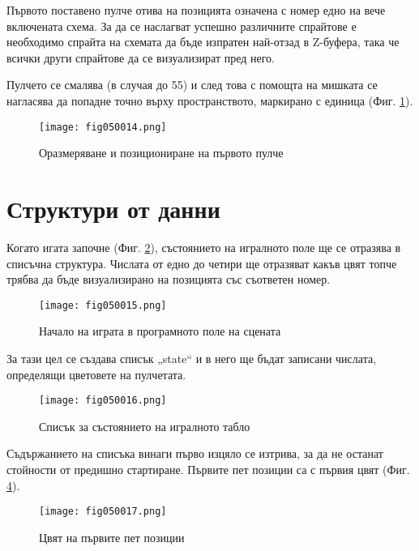 Първото поставено пулче отива на позицията означена с номер едно на вече включената схема. За да се наслагват успешно различните спрайтове е необходимо спрайта на схемата да бъде изпратен най-отзад в Z-буфера, така че всички други спрайтове да се визуализират пред него. 

Пулчето се смалява (в случая до 55) и след това с помощта на мишката се нагласява да попадне точно върху пространството, маркирано с единица (Фиг. \ref{fig050014}). 

\begin{figure}[H]
  \centering
  \texttt{[image: fig050014.png]}
  \caption{Оразмеряване и позициониране на първото пулче}
\label{fig050014}
\end{figure}

\section{Структури от данни}

Когато игата започне (Фиг. \ref{fig050015}), състоянието на игралното поле ще се отразява в списъчна структура. Числата от едно до четири ще отразяват какъв цвят топче трябва да бъде визуализирано на позицията със съответен номер.

\begin{figure}[H]
  \centering
  \texttt{[image: fig050015.png]}
  \caption{Начало на играта в програмното поле на сцената}
\label{fig050015}
\end{figure}

За тази цел се създава списък „state“ и в него ще бъдат записани числата, определящи цветовете на пулчетата. 

\begin{figure}[H]
  \centering
  \texttt{[image: fig050016.png]}
  \caption{Списък за състоянието на игралното табло}
\label{fig050016}
\end{figure}

Съдържанието на списъка винаги първо изцяло се изтрива, за да не останат стойности от предишно стартиране. Първите пет позиции са с първия цвят (Фиг. \ref{fig050017}).

\begin{figure}[H]
  \centering
  \texttt{[image: fig050017.png]}
  \caption{Цвят на първите пет позиции}
\label{fig050017}
\end{figure}

